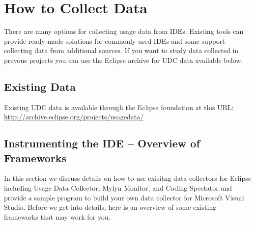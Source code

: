 \section{How to Collect Data}
\label{SecHowToCollectData}

There are many options for collecting usage data from IDEs.   Existing tools can provide ready made solutions for commonly used IDEs and some support collecting data from additional sources.   If you want to study data collected in prevous projects you can use the Eclipse archive for UDC data available below.

\subsection{Existing Data}

Existing UDC data is available through the Eclipse foundation at this URL:
\url{http://archive.eclipse.org/projects/usagedata/}

\subsection{Instrumenting the IDE -- Overview of Frameworks} 

In this section we discuss details on how to use exisitng data collectors for Eclipse including Usage Data Collector, Mylyn Monitor, and Coding Spectator and provide a sample program to build your own data collector for Microsoft Visual Studio.  Before we get into details, here is an overview of some existing frameworks that may work for you.

